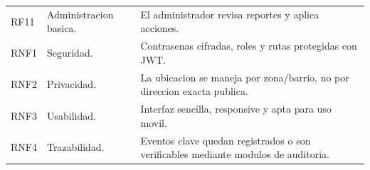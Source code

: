 \documentclass{article}
\begin{document}
\begin{longtable}{p{1.2cm} p{6.2cm} p{6.8cm}}
    RF11          & Administracion basica.                                & El administrador revisa reportes y aplica acciones.                                                 \\
    RNF1          & Seguridad.                                            & Contrasenas cifradas, roles y rutas protegidas con JWT.                                             \\
    RNF2          & Privacidad.                                           & La ubicacion se maneja por zona/barrio, no por direccion exacta publica.                            \\
    RNF3          & Usabilidad.                                           & Interfaz sencilla, responsive y apta para uso movil.                                                \\
    RNF4          & Trazabilidad.                                         & Eventos clave quedan registrados o son verificables mediante modulos de auditoria.                  \\
    \bottomrule
\end{longtable}
\end{document}
